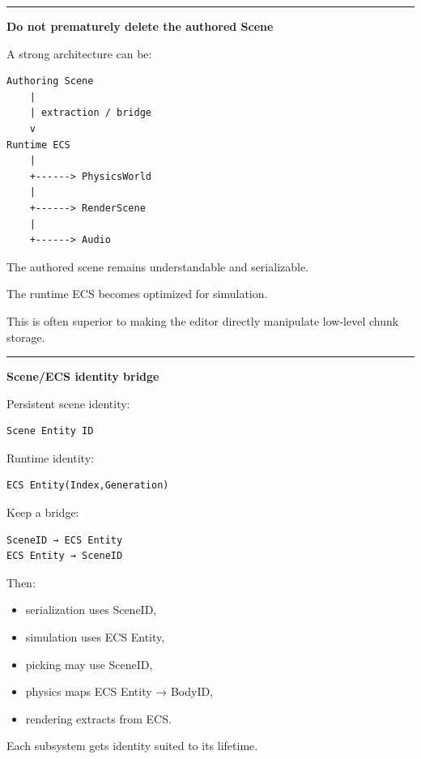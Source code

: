 \begin{center}\rule{0.5\linewidth}{0.5pt}\end{center}

\textbf{Do not prematurely delete the authored Scene}

A strong architecture can be:

\begin{verbatim}
Authoring Scene
    |
    | extraction / bridge
    v
Runtime ECS
    |
    +------> PhysicsWorld
    |
    +------> RenderScene
    |
    +------> Audio
\end{verbatim}

The authored scene remains understandable and serializable.

The runtime ECS becomes optimized for simulation.

This is often superior to making the editor directly manipulate low-level chunk storage.

\begin{center}\rule{0.5\linewidth}{0.5pt}\end{center}

\textbf{Scene/ECS identity bridge}

Persistent scene identity:

\begin{verbatim}
Scene Entity ID
\end{verbatim}

Runtime identity:

\begin{verbatim}
ECS Entity(Index,Generation)
\end{verbatim}

Keep a bridge:

\begin{verbatim}
SceneID → ECS Entity
ECS Entity → SceneID
\end{verbatim}

Then:

\begin{itemize}
\tightlist
\item
  serialization uses SceneID,
\item
  simulation uses ECS Entity,
\item
  picking may use SceneID,
\item
  physics maps ECS Entity → BodyID,
\item
  rendering extracts from ECS.
\end{itemize}

Each subsystem gets identity suited to its lifetime.

